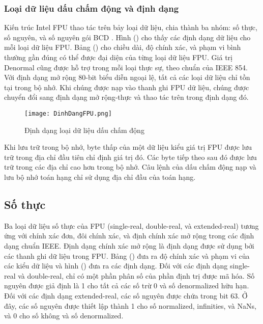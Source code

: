 		\subsubsection{Loại dữ liệu dấu chấm động và định dạng}
		Kiến trúc Intel FPU thao tác trên bảy loại dữ liệu, chia thành ba nhóm: số thực, số nguyên, và số nguyên gói BCD . Hình () cho thấy các định dạng dữ liệu cho mỗi loại dữ liệu FPU. Bảng () cho chiều dài, độ chính xác, và phạm vi bình thường gần đúng có thể được đại diện của từng loại dữ liệu FPU. Giá trị Denormal cũng được hỗ trợ trong mỗi loại thực sự, theo chuẩn của IEEE 854.\\
		
	Với định dạng mở rộng 80-bit biểu diễn ngoại lệ, tất cả các loại dữ liệu chỉ tồn tại trong bộ nhớ. Khi chúng được nạp vào thanh ghi FPU dữ liệu, chúng được chuyển đổi sang định dạng mở rộng-thực và thao tác trên trong định dạng đó.
	\begin{center}
			\begin{figure}[htp]
				\begin{center}
					\texttt{[image: DinhDangFPU.png]}
				\end{center}
				\caption{Định dạng loại dữ liệu dấu chấm động}				
				\label{fig:ProtectedFPU16}				
			\end{figure}
		\end{center}	
		
		Khi lưu trữ trong bộ nhớ, byte thấp của một dữ liệu kiểu giá trị FPU được lưu trữ trong địa chỉ đầu tiên chỉ định giá trị đó. Các byte tiếp theo sau đó được lưu trữ trong các địa chỉ cao hơn trong bộ nhớ. Câu lệnh của dấu chấm động nạp và lưu bộ nhớ toán hạng chỉ sử dụng địa chỉ đầu của toán hạng.
		
		\subsection*{Số thực}
		Ba loại dữ liệu số thực của FPU (single-real, double-real, và extended-real) tương ứng với chính xác đơn, đôi chính xác, và định chính xác mở rộng trong các định dạng chuẩn IEEE. Định dạng chính xác mở rộng là định dạng được sử dụng bởi các thanh ghi dữ liệu trong FPU. Bảng () đưa ra độ chính xác và phạm vi của các kiểu dữ liệu và hình () đưa ra các định dạng. Đối với các định dạng single-real và double-real, chỉ có một phần phân số của phần định trị được mã hóa. Số nguyên được giả định là 1 cho tất cả các số trừ 0 và số denormalized hữu hạn. Đối với các định dạng extended-real, các số nguyên được chứa trong bit 63. Ở đây, các số nguyên được thiết lập thành 1 cho số normalized, infinities, và NaNs, và 0 cho số không và số denormalized. \\	 
		
